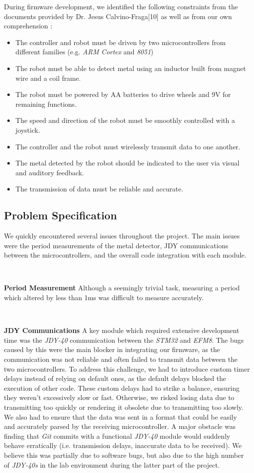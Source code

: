 \documentclass{article}
\begin{document}
During firmware development, we identified the following constraints from the
documents provided by Dr. Jesus Calvino-Fraga[10] as well as from our own comprehension : \\
\begin{itemize}
  \item The controller and robot must be driven by two microcontrollers from different families (e.g. \textit{ARM Cortex} and \textit{8051})
  \item The robot must be able to detect metal using an inductor built from magnet wire and a coil frame.
  \item The robot must be powered by AA batteries to drive wheels and 9V for remaining functions.
  \item The speed and direction of the robot must be smoothly controlled with a joystick.
  \item The controller and the robot must wirelessly transmit data to one another.
  \item The metal detected by the robot should be indicated to the user via visual and auditory feedback.
  \item The transmission of data must be reliable and accurate.
\end{itemize}

\subsection{Problem Specification}

We quickly encountered several issues throughout the project. The main issues were the period measurements of the metal detector, JDY communications between the microcontrollers, and the overall code integration with each module.

\

\textbf{Period Measurement}
Although a seemingly trivial task, measuring a period which altered by less than 1ms was difficult to measure accurately. %

\

\textbf{JDY Communications}
A key module which required extensive development time was the \textit{JDY-40} communication between the \textit{STM32} and \textit{EFM8}.
The bugs caused by this were the main blocker in integrating our firmware, as the communication was not reliable and often failed to transmit
data between the two microcontrollers. To address this challenge, we had to introduce custom timer delays instead of relying on default ones,
as the default delays blocked the execution of other code. These custom delays had to strike a balance,
ensuring they weren't excessively slow or fast. Otherwise, we risked losing data due to transmitting too quickly or rendering it obsolete
due to transmitting too slowly. We also had to ensure that the data was sent in a format that could be easily and accurately parsed by the
receiving microcontroller. A major obstacle was finding that \textit{Git} commits with a functional \textit{JDY-40} module would suddenly behave erratically
(i.e. transmission delays, inaccurate data to be received). We believe this was partially due to software bugs, but also due to the high number of \textit{JDY-40s}
in the lab environment during the latter part of the project.
\end{document}
